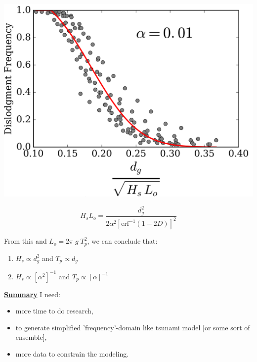 \documentclass{beamer}
\begin{document}
\begin{frame}[t]
\begin{center}

\includegraphics[scale=0.2]{bouldernewt.png}
\end{center}

\vspace*{-1em}\begin{equation}
H_s L_o = \frac{d^2_g}{2\alpha^2 \left[\textrm{erf}^{-1}(1 - 2D)\right]^2}
\end{equation}

From this and $L_o = 2\pi \;g \;T_p^2$, we can conclude that:
\begin{enumerate}
    \item $H_s \propto d^2_g$ and $T_p \propto d_g$
    \item $H_s \propto \left[\alpha^2\right]^{-1}$ and $T_p \propto \left[\alpha\right]^{-1}$
\end{enumerate}

\end{frame}

\begin{frame}
  \begin{block}{\textbf{\underline{Summary}}}
    I need:
\begin{itemize}
    \item more time to do research,
    \item to generate simplified 'frequency'-domain like tsunami model [or some
      sort of ensemble],
    \item more data to constrain the modeling.
\end{itemize}
\end{block}
\end{frame}
\end{document}
